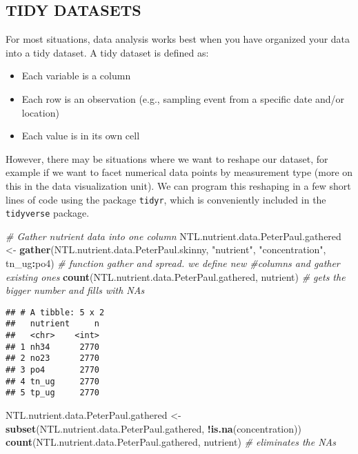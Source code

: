 \documentclass[]{article}
\newenvironment{Shaded}{\begin{snugshade}}{\end{snugshade}}
\newcommand{\KeywordTok}[1]{\textcolor[rgb]{0.13,0.29,0.53}{\textbf{#1}}}
\newcommand{\StringTok}[1]{\textcolor[rgb]{0.31,0.60,0.02}{#1}}
\newcommand{\CommentTok}[1]{\textcolor[rgb]{0.56,0.35,0.01}{\textit{#1}}}
\newcommand{\OperatorTok}[1]{\textcolor[rgb]{0.81,0.36,0.00}{\textbf{#1}}}
\newcommand{\NormalTok}[1]{#1}
\providecommand{\tightlist}{%
  \setlength{\itemsep}{0pt}\setlength{\parskip}{0pt}}
\begin{document}
\subsection{TIDY DATASETS}\label{tidy-datasets}

For most situations, data analysis works best when you have organized
your data into a tidy dataset. A tidy dataset is defined as:

\begin{itemize}
\tightlist
\item
  Each variable is a column
\item
  Each row is an observation (e.g., sampling event from a specific date
  and/or location)
\item
  Each value is in its own cell
\end{itemize}

However, there may be situations where we want to reshape our dataset,
for example if we want to facet numerical data points by measurement
type (more on this in the data visualization unit). We can program this
reshaping in a few short lines of code using the package \texttt{tidyr},
which is conveniently included in the \texttt{tidyverse} package.

\begin{Shaded}
\begin{Highlighting}[]
\CommentTok{# Gather nutrient data into one column}
\NormalTok{NTL.nutrient.data.PeterPaul.gathered <-}\StringTok{ }\KeywordTok{gather}\NormalTok{(NTL.nutrient.data.PeterPaul.skinny, }\StringTok{"nutrient"}\NormalTok{, }\StringTok{"concentration"}\NormalTok{, tn_ug}\OperatorTok{:}\NormalTok{po4) }\CommentTok{# function gather and spread. we define new #columns and gather existing ones}
\KeywordTok{count}\NormalTok{(NTL.nutrient.data.PeterPaul.gathered, nutrient) }\CommentTok{# gets the bigger number and fills with NAs}
\end{Highlighting}
\end{Shaded}

\begin{verbatim}
## # A tibble: 5 x 2
##   nutrient     n
##   <chr>    <int>
## 1 nh34      2770
## 2 no23      2770
## 3 po4       2770
## 4 tn_ug     2770
## 5 tp_ug     2770
\end{verbatim}

\begin{Shaded}
\begin{Highlighting}[]
\NormalTok{NTL.nutrient.data.PeterPaul.gathered <-}\StringTok{ }\KeywordTok{subset}\NormalTok{(NTL.nutrient.data.PeterPaul.gathered, }\OperatorTok{!}\KeywordTok{is.na}\NormalTok{(concentration))}
\KeywordTok{count}\NormalTok{(NTL.nutrient.data.PeterPaul.gathered, nutrient) }\CommentTok{# eliminates the NAs}
\end{Highlighting}
\end{Shaded}
\end{document}

